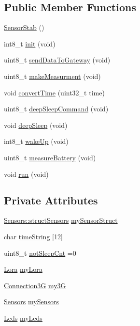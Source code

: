 \subsection*{Public Member Functions}
\begin{DoxyCompactItemize}
\item 
\hyperlink{class_sensor_stab_a193dcd1ab48ee477d9f1538d97b940ac}{Sensor\+Stab} ()
\item 
int8\+\_\+t \hyperlink{class_sensor_stab_a7e38f5dab7ced64f4bc7afad756b9edf}{init} (void)
\item 
uint8\+\_\+t \hyperlink{class_sensor_stab_afe4902b857f2f16175a2f26ecc6f0436}{send\+Data\+To\+Gateway} (void)
\item 
uint8\+\_\+t \hyperlink{class_sensor_stab_a6d9bb52609855eda37c2436765cc1309}{make\+Measurment} (void)
\item 
void \hyperlink{class_sensor_stab_a8fcf0abce0941e18a28af79deccd945d}{convert\+Time} (uint32\+\_\+t time)
\item 
uint8\+\_\+t \hyperlink{class_sensor_stab_a1113905c693a1f600f257a49832a7ba7}{deep\+Sleep\+Command} (void)
\item 
void \hyperlink{class_sensor_stab_a3dc9368e342da67f49d83fbf3993d60c}{deep\+Sleep} (void)
\item 
int8\+\_\+t \hyperlink{class_sensor_stab_aa642f127f14d2deea1ec674dab3ceac6}{wake\+Up} (void)
\item 
uint8\+\_\+t \hyperlink{class_sensor_stab_a2fae9331da147abfde691a430131c75c}{measure\+Battery} (void)
\item 
void \hyperlink{class_sensor_stab_a4394ab5f892c8f1f7920f14674be5d69}{run} (void)
\end{DoxyCompactItemize}
\subsection*{Private Attributes}
\begin{DoxyCompactItemize}
\item 
\hyperlink{struct_sensors_1_1struct_sensors}{Sensors\+::struct\+Sensors} \hyperlink{class_sensor_stab_abf7a8586c865cfd3e3155392323d5b8a}{my\+Sensor\+Struct}
\item 
char \hyperlink{class_sensor_stab_aded3f5795a5d2ded34d6f92b0fbc2f15}{time\+String} \mbox{[}12\mbox{]}
\item 
uint8\+\_\+t \hyperlink{class_sensor_stab_accf54181552ac1003ec399401b0a61be}{not\+Sleep\+Cnt} =0
\item 
\hyperlink{class_lora}{Lora} \hyperlink{class_sensor_stab_a512a8b4918901f8326475caf6ed9ed7b}{my\+Lora}
\item 
\hyperlink{class_connection3_g}{Connection3G} \hyperlink{class_sensor_stab_a6f4f4186b2a8aa2f80e626bbdd181ad1}{my3G}
\item 
\hyperlink{class_sensors}{Sensors} \hyperlink{class_sensor_stab_af8b2172b2218888adf62f95b4aa4b72d}{my\+Sensors}
\item 
\hyperlink{class_leds}{Leds} \hyperlink{class_sensor_stab_a039887cb4d0ae1f2358318686ffd6deb}{my\+Leds}
\end{DoxyCompactItemize}


